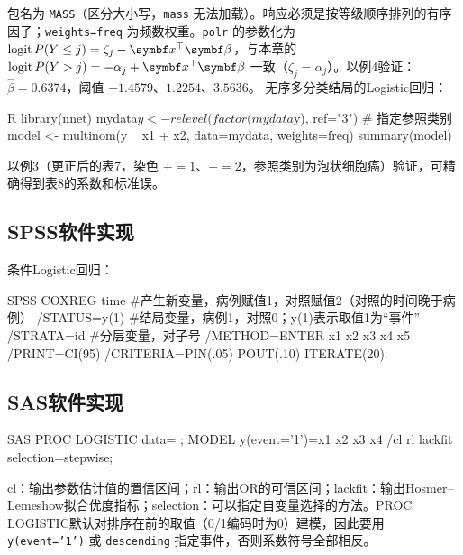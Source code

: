 \par
包名为 \texttt{MASS}（区分大小写，\texttt{mass} 无法加载）。响应必须是按等级顺序排列的有序因子；\texttt{weights=freq} 为频数权重。\texttt{polr} 的参数化为 $\logit P(Y\le j)=\zeta_j-\bm x^\top\bm\beta$，与本章的 $\logit P(Y>j)=-\alpha_j+\bm x^\top\bm\beta$ 一致（$\zeta_j=\alpha_j$）。以例4验证：$\widehat\beta=0.6374$，阈值 $-1.4579$、$1.2254$、$3.5636$。
无序多分类结局的Logistic回归：
\par\noindent
\begin{coursecode}{R}
library(nnet)
mydata$y <- relevel(factor(mydata$y), ref="3")   # 指定参照类别
model <- multinom(y ~ x1 + x2, data=mydata, weights=freq)
summary(model)
\end{coursecode}
\par
以例3（更正后的表7，染色 $+=1$、$-=2$，参照类别为泡状细胞癌）验证，可精确得到表8的系数和标准误。
\subsection{SPSS软件实现}
条件Logistic回归：
\par\noindent
\begin{coursecode}{SPSS}
COXREG time #产生新变量，病例赋值1，对照赋值2（对照的时间晚于病例）
 /STATUS=y(1) #结局变量，病例1，对照0；y(1)表示取值1为“事件”
 /STRATA=id #分层变量，对子号
 /METHOD=ENTER x1 x2 x3 x4 x5
 /PRINT=CI(95)
 /CRITERIA=PIN(.05) POUT(.10) ITERATE(20).
\end{coursecode}
\par
{}
\subsection{SAS软件实现}
\par\noindent
\begin{coursecode}{SAS}
PROC LOGISTIC data= ;
MODEL y(event='1')=x1 x2 x3 x4 /cl rl lackfit selection=stepwise;
\end{coursecode}
\par
cl：输出参数估计值的置信区间；rl：输出OR的可信区间；lackfit：输出Hosmer--Lemeshow拟合优度指标；selection：可以指定自变量选择的方法。PROC LOGISTIC默认对排序在前的取值（0/1编码时为0）建模，因此要用 \texttt{y(event='1')} 或 \texttt{descending} 指定事件，否则系数符号全部相反。

